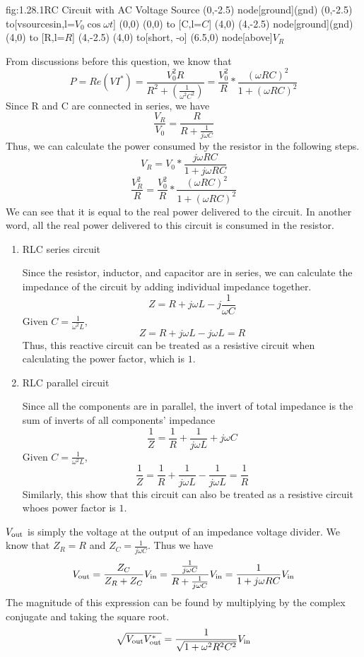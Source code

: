 \begin{circuit}{fig:1.28.1}{RC Circuit with AC Voltage Source}
    (0,-2.5) node[ground](gnd){}
    (0,-2.5) to[vsourcesin,l=$V_0\cos\omega t$] (0,0)
    (0,0) to [C,l=$C$] (4,0)
    (4,-2.5) node[ground](gnd){}
    (4,0) to [R,l=$R$] (4,-2.5)
    (4,0) to[short, -o] (6.5,0) node[above]{$V_R$}
\end{circuit}
From discussions before this question, we know that 
\[P = Re(VI^*)=\frac{V_0^2R}{R^2+(\frac{1}{\omega^2C^2})}=\frac{V_0^2}{R} * \frac{(\omega RC)^2}{1 + (\omega RC)^2}\]
Since R and C are connected in series, we have
\[\frac{V_R}{V_0} = \frac{R}{R + \frac{1}{j\omega C}}\]
Thus, we can calculate the power consumed by the resistor in the following steps.
\[V_R = V_0 * \frac{j\omega RC}{1+j\omega RC}\]
\[\frac{V_R^2}{R} =\frac{V_0^2}{R} * \frac{(\omega RC)^2}{1 + (\omega RC)^2}\]
We can see that it is equal to the real power delivered to the circuit. In another word, all the real power delivered to this circuit is consumed in the resistor.
\begin{enumerate}
    \item RLC series circuit
    
    Since the resistor, inductor, and capacitor are in series, we can calculate the impedance of the circuit by adding individual impedance together.
    \[Z = R + j\omega L - j \frac{1}{\omega C} \]
    Given $C = \frac{1}{\omega^2 L}$, 
    \[Z = R + j\omega L - j\omega L = R \]
    Thus, this reactive circuit can be treated as a resistive circuit when calculating the power factor, which is $1$.
    \item RLC parallel circuit
    
    Since all the components are in parallel, the invert of total impedance is the sum of inverts of all components' impedance
    \[\frac{1}{Z} = \frac{1}{R} + \frac{1}{j\omega L} + j \omega C\]
    Given $C = \frac{1}{\omega^2 L}$, 
    \[\frac{1}{Z} = \frac{1}{R} + \frac{1}{j\omega L} - \frac{1}{j\omega L} = \frac{1}{R}\]
    Similarly, this show that this circuit can also be treated as a resistive circuit whoes power factor is $1$.
\end{enumerate}
$V_{\text{out}}$ is simply the voltage at the output of an impedance voltage divider. We know that $Z_R = R$ and $Z_C = \frac{1}{j\omega C}$. Thus we have 
\[V_{\text{out}} = \frac{Z_C}{Z_R + Z_C} V_{\text{in}} = \frac{\frac{1}{j \omega C}}{R + \frac{1}{j \omega C}} V_{\text{in}} = \frac{1}{1 + j \omega R C} V_{\text{in}}\]
The magnitude of this expression can be found by multiplying by the complex conjugate and taking the square root.
\[\sqrt{V_{\text{out}} V_{\text{out}}^*} = \frac{1}{\sqrt{1 + \omega^2R^2C^2}}V_{\text{in}}\]

